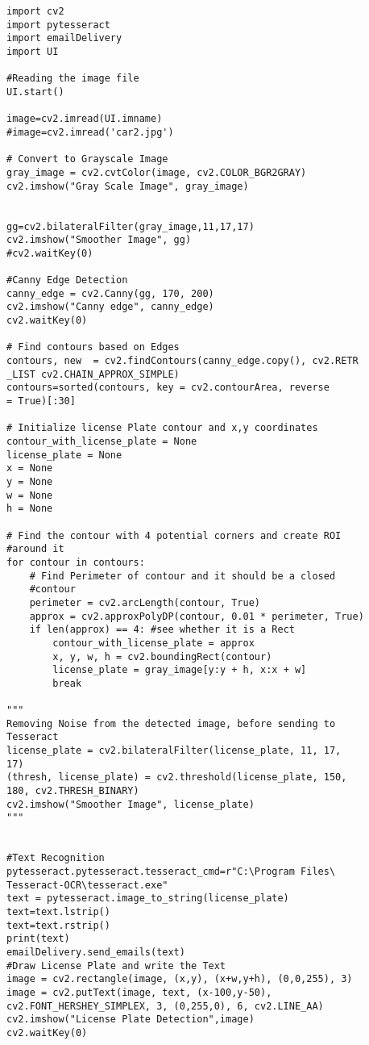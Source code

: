 \documentclass[12pt,a4paper]{report}
\begin{document}
\begin{lstlisting}
import cv2
import pytesseract
import emailDelivery
import UI

#Reading the image file
UI.start()

image=cv2.imread(UI.imname) 
#image=cv2.imread('car2.jpg')

# Convert to Grayscale Image
gray_image = cv2.cvtColor(image, cv2.COLOR_BGR2GRAY)
cv2.imshow("Gray Scale Image", gray_image)


gg=cv2.bilateralFilter(gray_image,11,17,17)
cv2.imshow("Smoother Image", gg)
#cv2.waitKey(0)

#Canny Edge Detection
canny_edge = cv2.Canny(gg, 170, 200)
cv2.imshow("Canny edge", canny_edge)
cv2.waitKey(0)

# Find contours based on Edges
contours, new  = cv2.findContours(canny_edge.copy(), cv2.RETR
_LIST cv2.CHAIN_APPROX_SIMPLE)
contours=sorted(contours, key = cv2.contourArea, reverse 
= True)[:30]

# Initialize license Plate contour and x,y coordinates
contour_with_license_plate = None
license_plate = None
x = None
y = None
w = None
h = None

# Find the contour with 4 potential corners and create ROI 
#around it
for contour in contours:
    # Find Perimeter of contour and it should be a closed
    #contour
    perimeter = cv2.arcLength(contour, True)
    approx = cv2.approxPolyDP(contour, 0.01 * perimeter, True)
    if len(approx) == 4: #see whether it is a Rect
        contour_with_license_plate = approx
        x, y, w, h = cv2.boundingRect(contour)
        license_plate = gray_image[y:y + h, x:x + w]
        break
        
"""
Removing Noise from the detected image, before sending to
Tesseract
license_plate = cv2.bilateralFilter(license_plate, 11, 17, 
17)
(thresh, license_plate) = cv2.threshold(license_plate, 150, 
180, cv2.THRESH_BINARY)
cv2.imshow("Smoother Image", license_plate)
"""


#Text Recognition
pytesseract.pytesseract.tesseract_cmd=r"C:\Program Files\
Tesseract-OCR\tesseract.exe"
text = pytesseract.image_to_string(license_plate)
text=text.lstrip()
text=text.rstrip()
print(text)
emailDelivery.send_emails(text)
#Draw License Plate and write the Text
image = cv2.rectangle(image, (x,y), (x+w,y+h), (0,0,255), 3) 
image = cv2.putText(image, text, (x-100,y-50), 
cv2.FONT_HERSHEY_SIMPLEX, 3, (0,255,0), 6, cv2.LINE_AA)
cv2.imshow("License Plate Detection",image)
cv2.waitKey(0)
\end{lstlisting}
\end{document}
